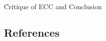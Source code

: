 \h{Critique of ECC and Conclusion}

\begin{refsection}







\newpage
\section{References}
\printbibliography[title={},heading=subbibliography]
\end{refsection}